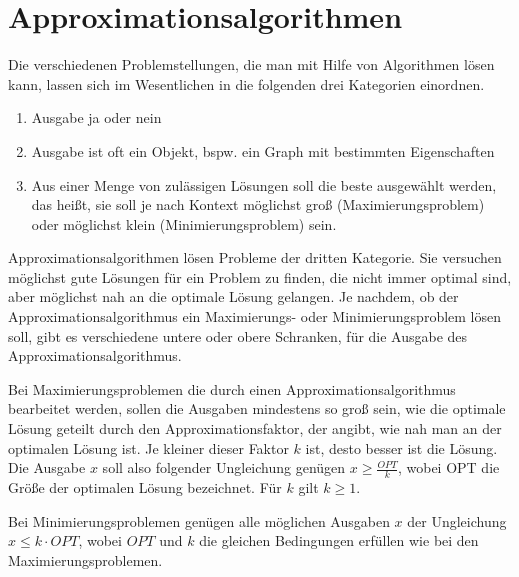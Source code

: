 \section{Approximationsalgorithmen}

Die verschiedenen Problemstellungen, die man mit Hilfe von Algorithmen lösen kann, lassen sich im Wesentlichen in die folgenden drei Kategorien einordnen.
\begin{enumerate}
\item {} Ausgabe \glqq ja\grqq{} oder \glqq nein\grqq
\item {} Ausgabe ist oft ein Objekt, bspw. ein Graph mit bestimmten Eigenschaften
\item {} Aus einer Menge von zulässigen Lösungen soll die beste ausgewählt werden, das heißt, sie soll je nach Kontext möglichst groß (Maximierungsproblem) oder möglichst klein (Minimierungsproblem) sein.
\end{enumerate}

Approximationsalgorithmen lösen Probleme der dritten Kategorie. Sie versuchen möglichst gute Lösungen für ein Problem zu finden, die nicht immer optimal sind, aber möglichst nah an die optimale Lösung gelangen. Je nachdem, ob der Approximationsalgorithmus ein Maximierungs- oder Minimierungsproblem lösen soll, gibt es verschiedene untere oder obere Schranken, für die Ausgabe des Approximationsalgorithmus.

Bei Maximierungsproblemen die durch einen Approximationsalgorithmus bearbeitet werden, sollen die Ausgaben mindestens so groß sein, wie die optimale Lösung geteilt durch den Approximationsfaktor, der angibt, wie nah man an der optimalen Lösung ist. Je kleiner dieser Faktor $k$ ist, desto besser ist die Lösung. Die Ausgabe $x$ soll also folgender Ungleichung genügen $x\geq \frac{OPT}{k}$, wobei OPT die Größe der optimalen Lösung bezeichnet. Für $k$ gilt $k\geq 1$.

Bei Minimierungsproblemen genügen alle möglichen Ausgaben $x$ der Ungleichung $x\leq k\cdot OPT$, wobei $OPT$ und $k$ die gleichen Bedingungen erfüllen wie bei den Maximierungsproblemen.


